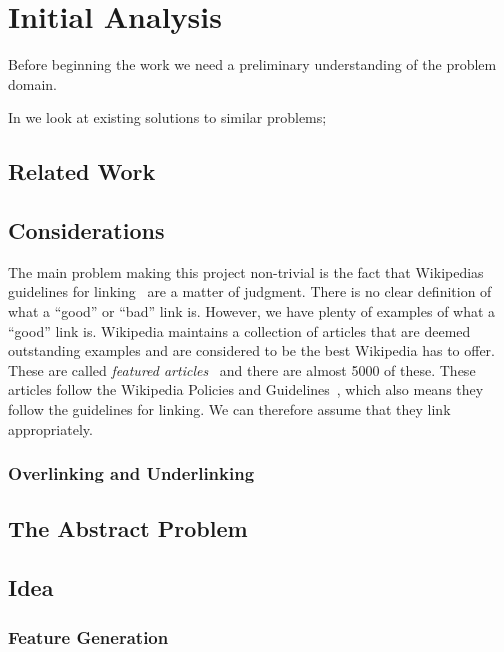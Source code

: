 \chapter{Initial Analysis}\label{chap:analysis}
Before beginning the work we need a preliminary understanding of the problem domain.

\begin{chapterorganization}
  \item In  we look at existing solutions to similar problems;
 
\end{chapterorganization}

\section{Related Work}\label{sec:related_work}
\dummy

\section{Considerations}
The main problem making this project non-trivial is the fact that Wikipedias guidelines for linking~\cite{wiki-manual-of-style-overlinking} are a matter of judgment. There is no clear definition of what a ``good'' or ``bad'' link is. However, we have plenty of examples of what a ``good'' link is.
Wikipedia maintains a collection of articles that are deemed outstanding examples and are considered to be the best Wikipedia has to offer. These are called \emph{featured articles}~\cite{wiki-featured-articles} and there are almost 5000 of these. These articles follow the Wikipedia Policies and Guidelines~\cite{wiki-editor-guidelines}, which also means they follow the guidelines for linking. We can therefore assume that they link appropriately.

\subsection{Overlinking and Underlinking}

\section{The Abstract Problem} 


\section{Idea} 

\subsection{Feature Generation}
\dummy

%
